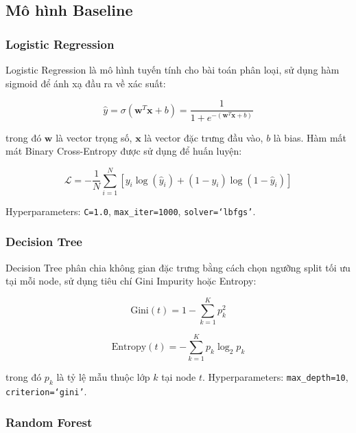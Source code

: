 \subsection{Mô hình Baseline}
\label{subsec:baseline_models}

\subsubsection{Logistic Regression}

Logistic Regression là mô hình tuyến tính cho bài toán phân loại, sử dụng hàm sigmoid để ánh xạ đầu ra về xác suất:

\begin{equation}
\hat{y} = \sigma(\mathbf{w}^T\mathbf{x} + b) = \frac{1}{1 + e^{-(\mathbf{w}^T\mathbf{x} + b)}}
\label{eq:logistic}
\end{equation}

trong đó $\mathbf{w}$ là vector trọng số, $\mathbf{x}$ là vector đặc trưng đầu vào, $b$ là bias. Hàm mất mát Binary Cross-Entropy được sử dụng để huấn luyện:

\begin{equation}
\mathcal{L} = -\frac{1}{N}\sum_{i=1}^{N}\left[y_i \log(\hat{y}_i) + (1 - y_i)\log(1 - \hat{y}_i)\right]
\label{eq:bce}
\end{equation}

Hyperparameters: \texttt{C=1.0}, \texttt{max\_iter=1000}, \texttt{solver=`lbfgs'}.

\subsubsection{Decision Tree}

Decision Tree phân chia không gian đặc trưng bằng cách chọn ngưỡng split tối ưu tại mỗi node, sử dụng tiêu chí Gini Impurity hoặc Entropy:

\begin{equation}
\text{Gini}(t) = 1 - \sum_{k=1}^{K} p_k^2
\label{eq:gini}
\end{equation}

\begin{equation}
\text{Entropy}(t) = -\sum_{k=1}^{K} p_k \log_2 p_k
\label{eq:entropy}
\end{equation}

trong đó $p_k$ là tỷ lệ mẫu thuộc lớp $k$ tại node $t$. Hyperparameters: \texttt{max\_depth=10}, \texttt{criterion=`gini'}.

\subsubsection{Random Forest}

